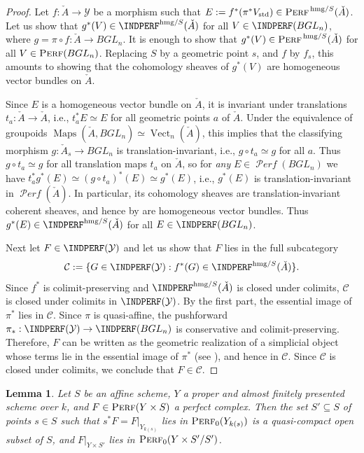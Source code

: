 \documentclass[12pt, oneside]{amsart}
\numberwithin{equation}{section}
\newtheorem{lemma}[subsubsection]{Lemma}
\theoremstyle{remark}
\theoremstyle{plain}
\DeclareMathOperator{\Perf}{\textsc{Perf}}
\DeclareMathOperator{\PERF}{\mathcal{P}\textit{erf}}
\DeclareMathOperator{\Map}{Maps}
\newcommand{\YY}{\mathcal{Y}}
\begin{document}
\begin{proof}
  Let $f : \check{A} \to \YY$ be a morphism such that $E := f^*(\pi^* V_{\mathrm{std}}) \in \Perf^{\,\mathrm{hmg}/S}(\check{A})$.
  Let us show that $g^*(V) \in \INDPERF^{\mathrm{hmg}/S}(\check{A})$ for all $V \in \INDPERF(BGL_n)$, where $g = \pi \circ f : \check{A} \to BGL_n$.
  It is enough to show that $g^*(V) \in \Perf^{\,\mathrm{hmg}/S}(\check{A})$ for all $V \in \Perf(BGL_n)$.
  Replacing $S$ by a geometric point $s$, and $f$ by $f_s$, this amounts to showing that the cohomology sheaves of $g^*(V)$ are homogeneous vector bundles on $\check{A}$.

  Since $E$ is a homogeneous vector bundle on $\check{A}$, it is invariant under translations $t_a : \check{A} \to \check{A}$, i.e., $t_a^* E \simeq E$ for all geometric points $a$ of $\check{A}$.
  Under the equivalence of groupoids $\Map(\check{A}, BGL_n) \simeq \operatorname{Vect}_n(\check{A})$, this implies that the classifying morphism $g : \check{A}_s \to BGL_n$ is translation-invariant, i.e., $g \circ t_a \simeq g$ for all $a$.
  Thus $g \circ t_a \simeq g$ for all translation maps $t_a$ on $\check{A}$, so for \emph{any} $E \in \PERF(BGL_n)$ we have $t_a^* g^*(E) \simeq (g \circ t_a)^*(E) \simeq g^*(E)$, i.e., $g^*(E)$ is translation-invariant in $\PERF(\check{A})$.
  In particular, its cohomology sheaves are translation-invariant coherent sheaves, and hence by \cite[Exam.~3.2]{Mukai} are homogeneous vector bundles.
  Thus $g^*(E) \in \INDPERF^{\mathrm{hmg}/S}(\check{A})$ for all $E \in \INDPERF(BGL_n)$.

  Next let $F \in \INDPERF(\YY)$ and let us show that $F$ lies in the full subcategory
  \[ \mathcal{C} := \{ G \in \INDPERF(\YY) : f^*(G) \in \INDPERF^{\mathrm{hmg}/S}(\check{A})\}. \]
  Since $f^*$ is colimit-preserving and $\INDPERF^{\mathrm{hmg}/S}(\check{A})$ is closed under colimits, $\mathcal{C}$ is closed under colimits in $\INDPERF(\YY)$.
  By the first part, the essential image of $\pi^*$ lies in $\mathcal{C}$.
  Since $\pi$ is quasi-affine, the pushforward $\pi_* : \INDPERF(\YY) \to \INDPERF(BGL_n)$ is conservative and colimit-preserving.
  Therefore, $F$ can be written as the geometric realization of a simplicial object whose terms lie in the essential image of $\pi^*$ (see \cite[Prop.~4.7.3.14]{LurieHA}), and hence in $\mathcal{C}$.
  Since $\mathcal{C}$ is closed under colimits, we conclude that $F \in \mathcal{C}$.
\end{proof}

\begin{lemma}\label{0-open}
  Let $S$ be an affine scheme, $Y$ a proper and almost finitely presented scheme over $k$, and $F\in\Perf(Y\times S)$ a perfect complex.
  Then the set $S' \subseteq S$ of points $s \in S$ such that $s^*F = F|_{Y_{k(s)}}$ lies in $\Perf_{0}(Y_{k(s)})$ is a quasi-compact open subset of $S$, and $F|_{Y \times S'}$ lies in $\Perf_{0}(Y\times S'/S')$.
\end{lemma}
\end{document}

